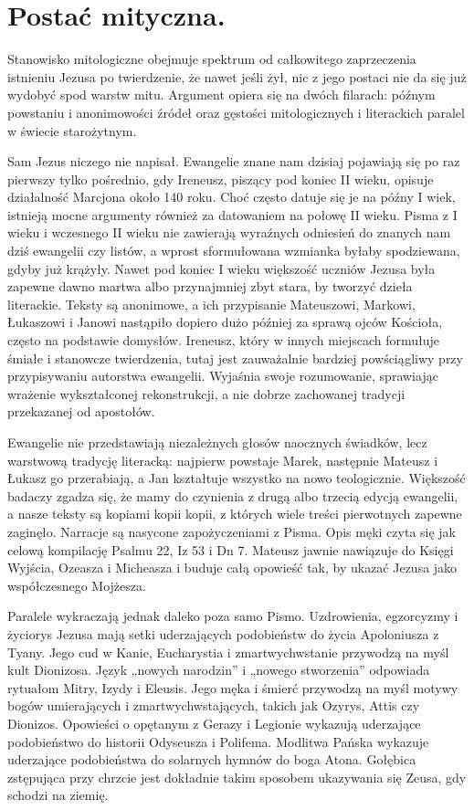 \section{Postać mityczna.}

\label{sec:mythical}

Stanowisko mitologiczne obejmuje spektrum od całkowitego zaprzeczenia istnieniu Jezusa po twierdzenie, że nawet jeśli żył, nic z jego postaci nie da się już wydobyć spod warstw mitu.
Argument opiera się na dwóch filarach: późnym powstaniu i anonimowości źródeł oraz gęstości mitologicznych i literackich paralel w świecie starożytnym.

Sam Jezus niczego nie napisał.
Ewangelie znane nam dzisiaj pojawiają się po raz pierwszy tylko pośrednio, gdy Ireneusz, piszący pod koniec II wieku, opisuje działalność Marcjona około 140 roku.
Choć często datuje się je na późny I wiek, istnieją mocne argumenty również za datowaniem na połowę II wieku.
Pisma z I wieku i wczesnego II wieku nie zawierają wyraźnych odniesień do znanych nam dziś ewangelii czy listów, a wprost sformułowana wzmianka byłaby spodziewana, gdyby już krążyły.
Nawet pod koniec I wieku większość uczniów Jezusa była zapewne dawno martwa albo przynajmniej zbyt stara, by tworzyć dzieła literackie.
Teksty są anonimowe, a ich przypisanie Mateuszowi, Markowi, Łukaszowi i Janowi nastąpiło dopiero dużo później za sprawą ojców Kościoła, często na podstawie domysłów.
Ireneusz, który w innych miejscach formułuje śmiałe i stanowcze twierdzenia, tutaj jest zauważalnie bardziej powściągliwy przy przypisywaniu autorstwa ewangelii.
Wyjaśnia swoje rozumowanie, sprawiając wrażenie wykształconej rekonstrukcji, a nie dobrze zachowanej tradycji przekazanej od apostołów.

Ewangelie nie przedstawiają niezależnych głosów naocznych świadków, lecz warstwową tradycję literacką: najpierw powstaje Marek, następnie Mateusz i Łukasz go przerabiają, a Jan kształtuje wszystko na nowo teologicznie.
Większość badaczy zgadza się, że mamy do czynienia z drugą albo trzecią edycją ewangelii, a nasze teksty są kopiami kopii kopii, z których wiele treści pierwotnych zapewne zaginęło.
Narracje są nasycone zapożyczeniami z Pisma.
Opis męki czyta się jak celową kompilację Psalmu 22, Iz 53 i Dn 7.
Mateusz jawnie nawiązuje do Księgi Wyjścia, Ozeasza i Micheasza i buduje całą opowieść tak, by ukazać Jezusa jako współczesnego Mojżesza.

Paralele wykraczają jednak daleko poza samo Pismo.
Uzdrowienia, egzorcyzmy i życiorys Jezusa mają setki uderzających podobieństw do życia Apoloniusza z Tyany.
Jego cud w Kanie, Eucharystia i zmartwychwstanie przywodzą na myśl kult Dionizosa.
Język „nowych narodzin” i „nowego stworzenia” odpowiada rytuałom Mitry, Izydy i Eleusis.
Jego męka i śmierć przywodzą na myśl motywy bogów umierających i zmartwychwstających, takich jak Ozyrys, Attis czy Dionizos.
Opowieści o opętanym z Gerazy i Legionie wykazują uderzające podobieństwo do historii Odyseusza i Polifema.
Modlitwa Pańska wykazuje uderzające podobieństwa do solarnych hymnów do boga Atona.
Gołębica zstępująca przy chrzcie jest dokładnie takim sposobem ukazywania się Zeusa, gdy schodzi na ziemię.

